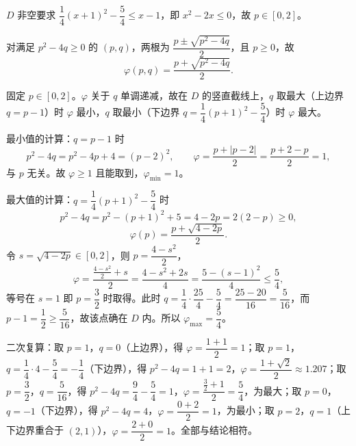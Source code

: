 \begin{answer}
$D$ 非空要求 $\dfrac14(x+1)^2-\dfrac54\leqslant x-1$，即 $x^2-2x\leqslant0$，故 $p\in[0,2]$。

对满足 $p^2-4q\geqslant0$ 的 $(p,q)$，两根为 $\dfrac{p\pm\sqrt{p^2-4q}}{2}$，且 $p\geqslant0$，故
\nopagebreak[4]
\[\varphi(p,q)=\frac{p+\sqrt{p^2-4q}}{2}.\]

固定 $p\in[0,2]$。$\varphi$ 关于 $q$ 单调递减，故在 $D$ 的竖直截线上，$q$ 取最大（上边界 $q=p-1$）时 $\varphi$ 最小，$q$ 取最小（下边界 $q=\dfrac14(p+1)^2-\dfrac54$）时 $\varphi$ 最大。

最小值的计算：$q=p-1$ 时
\nopagebreak[4]
\[p^2-4q=p^2-4p+4=(p-2)^2,\qquad \varphi=\frac{p+|p-2|}{2}=\frac{p+2-p}{2}=1,\]
与 $p$ 无关。故 $\varphi\geqslant1$ 且能取到，$\varphi_{\min}=1$。

最大值的计算：$q=\dfrac14(p+1)^2-\dfrac54$ 时
\nopagebreak[4]
\[p^2-4q=p^2-(p+1)^2+5=4-2p=2(2-p)\geqslant0,\]
\nopagebreak[4]
\[\varphi(p)=\frac{p+\sqrt{4-2p}}{2}.\]
令 $s=\sqrt{4-2p}\in[0,2]$，则 $p=\dfrac{4-s^2}{2}$，
\nopagebreak[4]
\[\varphi=\frac{\frac{4-s^2}{2}+s}{2}=\frac{4-s^2+2s}{4}=\frac{5-(s-1)^2}{4}\leqslant\frac54,\]
等号在 $s=1$ 即 $p=\dfrac32$ 时取得。此时 $q=\dfrac14\cdot\dfrac{25}{4}-\dfrac54=\dfrac{25-20}{16}=\dfrac{5}{16}$，而 $p-1=\dfrac12\geqslant\dfrac{5}{16}$，故该点确在 $D$ 内。所以 $\varphi_{\max}=\dfrac54$。

二次复算：取 $p=1$，$q=0$（上边界），得 $\varphi=\dfrac{1+1}{2}=1$；取 $p=1$，$q=\dfrac14\cdot4-\dfrac54=-\dfrac14$（下边界），得 $p^2-4q=1+1=2$，$\varphi=\dfrac{1+\sqrt2}{2}\approx1.207$；取 $p=\dfrac32$，$q=\dfrac{5}{16}$，得 $p^2-4q=\dfrac94-\dfrac54=1$，$\varphi=\dfrac{\frac32+1}{2}=\dfrac54$，为最大；取 $p=0$，$q=-1$（下边界），得 $p^2-4q=4$，$\varphi=\dfrac{0+2}{2}=1$，为最小；取 $p=2$，$q=1$（上下边界重合于 $(2,1)$），$\varphi=\dfrac{2+0}{2}=1$。全部与结论相符。




\end{answer}